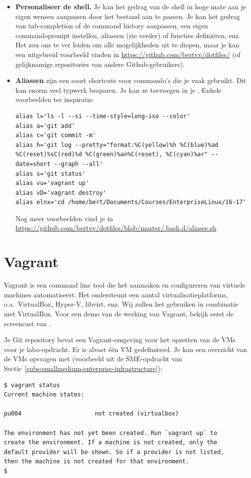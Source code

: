 \begin{itemize}
  \item \textbf{Personaliseer de shell.} Je kan het gedrag van de shell in hoge mate aan je eigen wensen aanpassen door het bestand  aan te passen. Je kan het gedrag van tab-completion of de command history aanpassen, een eigen commandoprompt instellen, aliassen (zie verder) of functies definiëren, enz. Het zou ons te ver leiden om alle mogelijkheden uit te diepen, maar je kan een uitgebreid voorbeeld vinden in \url{https://github.com/bertvv/dotfiles/} (of gelijknamige repositories van andere Github-gebruikers).

  \item \textbf{Aliassen} zijn een soort shortcuts voor commando's die je vaak gebruikt. Dit kan enorm veel typwerk besparen. Je kan ze toevoegen in je . Enkele voorbeelden ter inspiratie:

    \begin{verbatim}
alias l='ls -l --si --time-style=long-iso --color'
alias a='git add'
alias c='git commit -m'
alias h='git log --pretty="format:%C(yellow)%h %C(blue)%ad %C(reset)%sC(red)%d %C(green)%an%C(reset), %C(cyan)%ar" --date=short --graph --all'
alias s='git status'
alias vu='vagrant up'
alias vD='vagrant destroy'
alias elnx='cd /home/bert/Documents/Courses/EnterpriseLinux/16-17'
\end{verbatim}

    Nog meer voorbeelden vind je in \url{https://github.com/bertvv/dotfiles/blob/master/.bash.d/aliases.sh}.
\end{itemize}

\section{Vagrant}
\label{sec:vagrant}

Vagrant is een command line tool die het aanmaken en configureren van virtuele machines automatiseert. Het ondersteunt een aantal virtualisatieplatforms, o.a.~VirtualBox, Hyper-V, libvirt, enz. Wij zullen het gebruiken in combinatie met VirtualBox. Voor een demo van de werking van Vagrant, bekijk eerst de screencast van \textcite{Weissig2014}.

Je Git repository bevat een Vagrant-omgeving voor het opzetten van de VMs voor je labo-opdracht. Er is alvast één VM gedefinieerd.  Je kan een overzicht van de VMs opvragen met (voorbeeld uit de SME-opdracht van Sectie~\ref{subs:smallmedium-enterprise-infrastructure}):

\begin{verbatim}
$ vagrant status
Current machine states:

pu004                     not created (virtualbox)

The environment has not yet been created. Run `vagrant up` to
create the environment. If a machine is not created, only the
default provider will be shown. So if a provider is not listed,
then the machine is not created for that environment.
$
\end{verbatim}

